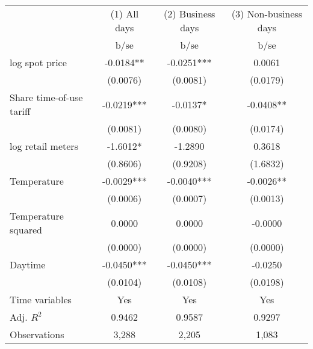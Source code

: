 \begin{tabular}{lccc}\toprule
                    &(1) All days   &(2) Business days   &(3) Non-business days   \\
                    &        b/se   &        b/se   &        b/se   \\
\midrule
log spot price      &     -0.0184** &     -0.0251***&      0.0061   \\
                    &    (0.0076)   &    (0.0081)   &    (0.0179)   \\
Share time-of-use tariff&     -0.0219***&     -0.0137*  &     -0.0408** \\
                    &    (0.0081)   &    (0.0080)   &    (0.0174)   \\
log retail meters   &     -1.6012*  &     -1.2890   &      0.3618   \\
                    &    (0.8606)   &    (0.9208)   &    (1.6832)   \\
Temperature         &     -0.0029***&     -0.0040***&     -0.0026** \\
                    &    (0.0006)   &    (0.0007)   &    (0.0013)   \\
Temperature squared &      0.0000   &      0.0000   &     -0.0000   \\
                    &    (0.0000)   &    (0.0000)   &    (0.0000)   \\
Daytime             &     -0.0450***&     -0.0450***&     -0.0250   \\
                    &    (0.0104)   &    (0.0108)   &    (0.0198)   \\
Time variables      &         Yes   &         Yes   &         Yes   \\
\midrule
Adj. \(R^2\)        &      0.9462   &      0.9587   &      0.9297   \\
Observations        &       3,288   &       2,205   &       1,083   \\
\bottomrule\end{tabular}
